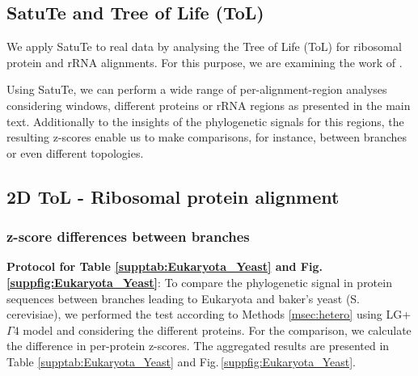 \begin{appendices}
\newpage
\section{SatuTe and Tree of Life (ToL)}

We apply SatuTe to real data by analysing the Tree of Life (ToL) for ribosomal protein and rRNA alignments.  For this purpose, we are examining the work of .

\medskip 

Using SatuTe, we can perform a wide range of per-alignment-region analyses considering windows, different proteins or rRNA regions as presented in the main text. Additionally to the insights of the phylogenetic signals for this regions, the resulting z-scores enable us to make comparisons, for instance, between branches or even different topologies. 

\subsection{2D ToL - Ribosomal protein alignment}

\subsubsection{z-score differences between branches}\label{suppsec:2DT_branch_zscore_diffs}

\noindent \textbf{Protocol for  Table \ref{supptab:Eukaryota_Yeast}  and Fig.\,\ref{suppfig:Eukaryota_Yeast}}:
 To compare the phylogenetic signal in protein sequences between branches leading to Eukaryota and baker's yeast (S. cerevisiae), we performed the test according to Methods \ref{msec:hetero} using LG+$\Gamma 4$ model and considering the different proteins. For the comparison, we calculate the difference in per-protein z-scores. The aggregated results are presented in Table \ref{supptab:Eukaryota_Yeast} and Fig.\,\ref{suppfig:Eukaryota_Yeast}.



\end{appendices}
